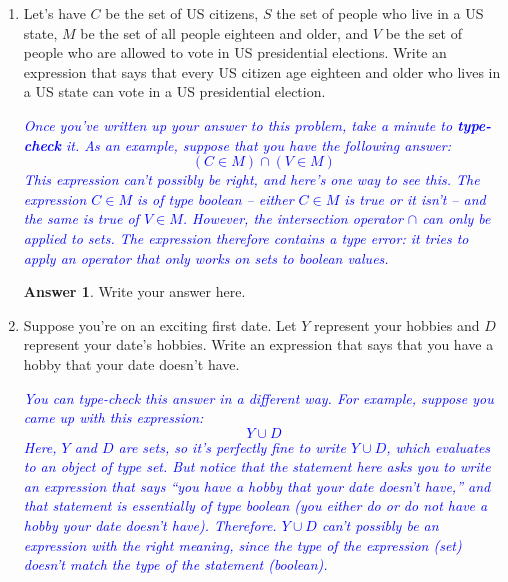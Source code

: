 \documentclass{article}
\renewcommand{\(}{\left(}
\renewcommand{\)}{\right)}
\theoremstyle{plain}
\theoremstyle{plain}
\theoremstyle{definition}
\newtheorem*{answer}{Answer}
\begin{document}
\begin{enumerate}[label*=\roman*.,ref=\roman*]

\item Let's have $C$ be the set of US citizens, $S$ the set of people who live in a US state, $M$ be the set of
all people eighteen and older, and $V$ be the set of people who are allowed to vote in US presidential
elections. Write an expression that says that every US citizen age eighteen and older who
lives in a US state can vote in a US presidential election.

\textit{\textcolor{blue}{Once you've written up your answer to this problem, take a minute to \textbf{type-check} it. As an example, suppose
that you have the following answer: 
\begin{equation*}
(C \in M) \cap (V \in M)
\end{equation*}
This expression can't possibly be right, and here's one way to see this. The expression $C \in M$ is of type
boolean -- either $C \in M$ is true or it isn't -- and the same is true of $V \in M$. However, the intersection operator
$\cap$ can only be applied to sets. The expression therefore contains a type error: it tries to apply an operator that only works on sets to boolean values. }}

\begin{shaded}
\begin{answer}
Write your answer here.
\end{answer}
\end{shaded}

\item Suppose you're on an exciting first date. Let $Y$ represent your hobbies and $D$ represent your
date's hobbies. Write an expression that says that you have a hobby that your date doesn't have.

\textit{\textcolor{blue}{You can type-check this answer in a different way. For example, suppose you came up with this expression:
\begin{equation*}
Y \cup D
\end{equation*}
Here, $Y$ and $D$ are sets, so it's perfectly fine to write $Y \cup D$, which evaluates to an object of type set. But
notice that the statement here asks you to write an expression that says ``you have a hobby that your date
doesn't have,'' and that statement is essentially of type boolean (you either do or do not have a hobby your
date doesn't have). Therefore. $Y \cup D$ can't possibly be an expression with the right meaning, since the type
of the expression (set) doesn't match the type of the statement (boolean). }}


\end{enumerate}
\end{document}
